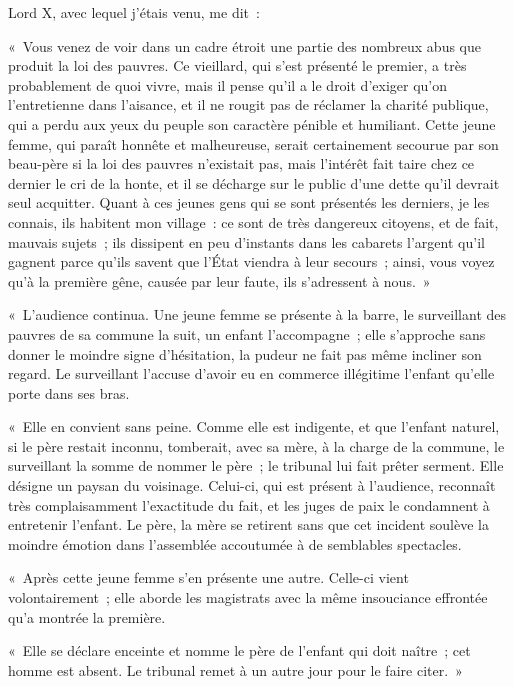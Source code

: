 \documentclass[french,twoside]{book} %
\newenvironment{quoteblock}%
  {\begin{quoting}}
  {\end{quoting}}
\newenvironment{quotebar}{%
    \def\FrameCommand{{\color{rubric!10!}\vrule width 0.5em} \hspace{0.9em}}%
    \def\OuterFrameSep{\itemsep} %
    \MakeFramed {\advance\hsize-\width \FrameRestore}
  }%
  {%
    \endMakeFramed
  }
\renewenvironment{quoteblock}%
  {%
    \savenotes
    \setstretch{0.9}
    \normalfont
    \begin{quotebar}
  }
  {%
    \end{quotebar}
    \spewnotes
  }
\begin{document}
\noindent Lord X, avec lequel j’étais venu, me dit :\par

\begin{quoteblock}
 \noindent « Vous venez de voir dans un cadre étroit une partie des nombreux abus que produit la loi des pauvres. Ce vieillard, qui s’est présenté le premier, a très probablement de quoi vivre, mais il pense qu’il a le droit d’exiger qu’on l’entretienne dans l’aisance, et il ne rougit pas de réclamer la charité publique, qui a perdu aux yeux du peuple son caractère pénible et humiliant. Cette jeune femme, qui paraît honnête et malheureuse, serait certainement secourue par son beau-père si la loi des pauvres n’existait pas, mais l’intérêt fait taire chez ce dernier le cri de la honte, et il se décharge sur le public d’une dette qu’il devrait seul acquitter. Quant à ces jeunes gens qui se sont présentés les derniers, je les connais, ils habitent mon village : ce sont de très dangereux citoyens, et de fait, mauvais sujets ; ils dissipent en peu d’instants dans les cabarets l’argent qu’il gagnent parce qu’ils savent que l’État viendra à leur secours ; ainsi, vous voyez qu’à la première gêne, causée par leur faute, ils s’adressent à nous. »
 \end{quoteblock}


\begin{quoteblock}
 \noindent « L'audience continua. Une jeune femme se présente à la barre, le surveillant des pauvres de sa commune la suit, un enfant l’accompagne ; elle s’approche sans donner le moindre signe d’hésitation, la pudeur ne fait pas même incliner son regard. Le surveillant l’accuse d’avoir eu en commerce illégitime l’enfant qu’elle porte dans ses bras.\par
 « Elle en convient sans peine. Comme elle est indigente, et que l’enfant naturel, si le père restait inconnu, tomberait, avec sa mère, à la charge de la commune, le surveillant la somme de nommer le père ; le tribunal lui fait prêter serment. Elle désigne un paysan du voisinage. Celui-ci, qui est présent à l’audience, reconnaît très complaisamment l’exactitude du fait, et les juges de paix le condamnent à entretenir l’enfant. Le père, la mère se retirent sans que cet incident soulève la moindre émotion dans l’assemblée accoutumée à de semblables spectacles.\par
 « Après cette jeune femme s’en présente une autre. Celle-ci vient volontairement ; elle aborde les magistrats avec la même insouciance effrontée qu’a montrée la première.\par
 « Elle se déclare enceinte et nomme le père de l’enfant qui doit naître ; cet homme est absent. Le tribunal remet à un autre jour pour le faire citer. »
 \end{quoteblock}
\end{document}
